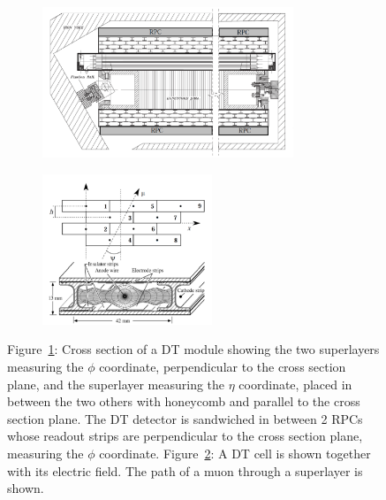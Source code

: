 	\begin{figure}[H]
		\begin{subfigure}{0.6\linewidth}
			\centering
			\includegraphics[height = 4.5cm]{fig/chapt2/DT_layout.png}
			\caption{\label{fig:DT:A}}
		\end{subfigure}
		\begin{subfigure}{0.4\linewidth}
			\centering
			\includegraphics[height = 4.5cm]{fig/chapt2/DT_cells.png}
			\caption{\label{fig:DT:B}}
		\end{subfigure}
		\caption{\label{fig:DT} Figure~\ref{fig:DT:A}: Cross section of a DT module showing the two superlayers measuring the $\phi$ coordinate, perpendicular to the cross section plane, and the superlayer measuring the $\eta$ coordinate, placed in between the two others with honeycomb and parallel to the cross section plane. The DT detector is sandwiched in between 2 RPCs whose readout strips are perpendicular to the cross section plane, measuring the $\phi$ coordinate. Figure~\ref{fig:DT:B}: A DT cell is shown together with its electric field. The path of a muon through a superlayer is shown.}
	\end{figure}
	
